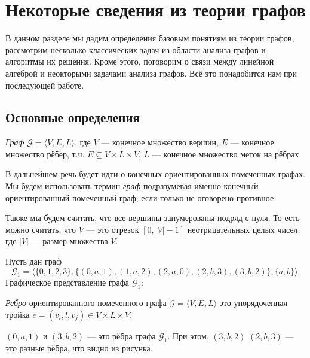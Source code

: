 \chapter{Некоторые сведения из теории графов}\label{chpt:GraphTheoryIntro}

В данном разделе мы дадим определения базовым понятиям из теории графов, рассмотрим несколько классических задач из области анализа графов и алгоритмы их решения. Кроме этого, поговорим о связи между линейной алгеброй и неокторыми задачами анализа графов.
Всё это понадобится нам при последующей работе.

\section{Основные определения}

\begin{definition}
  \textit{Граф} $\mathcal{G} = \langle V, E, L \rangle$, где $V$ --- конечное множество вершин, $E$ --- конечное множество рёбер, т.ч. $E \subseteq V \times L \times V$, $L$ --- конечное множество меток на рёбрах.
\end{definition}

В дальнейшем речь будет идти о конечных ориентированных помеченных графах.
Мы будем использовать термин \textit{граф} подразумевая именно конечный ориентированный помеченный граф, если только не оговорено противное.

Также мы будем считать, что все вершины занумерованы подряд с нуля.
То есть можно считать, что $V$ --- это отрезок $[0, |V| - 1]$ неотрицательных целых чисел, где $|V|$ --- размер множества $V$.

\begin{example}
  Пусть дан граф $$\mathcal{G}_1 = \langle \{0,1,2,3\}, \{(0,a,1), (1,a,2), (2,a,0), (2,b,3), (3,b,2)\}, \{a,b\} \rangle.$$
  Графическое представление графа $\mathcal{G}_1$:
  \begin{center}
  
  \end{center}
\end{example}

\begin{definition}
  \textit{Ребро} ориентированного помеченного графа $\mathcal{G} = \langle V, E, L \rangle$ это упорядоченная тройка $e = (v_i,l,v_j) \in V \times L \times V$.
\end{definition}

\begin{example}
$(0,a,1)$  и $(3,b,2)$ --- это рёбра графа $\mathcal{G}_1$. При этом, $(3,b,2)$ $(2,b,3)$ --- это разные рёбра, что видно из рисунка.
\end{example}

